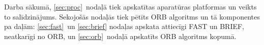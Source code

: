 Darba sākumā, \ref{sec:proc}~nodaļā tiek apskatītas aparatūras platformas
un veikts to salīdzinājums. Sekojošās nodaļās tiek pētīts ORB algoritms un
tā komponentes pa daļām: \ref{sec:fast}~un \ref{sec:brief} nodaļas apskata
attiecīgi FAST un BRIEF, neatkarīgi no ORB, un \ref{sec:orb}~nodaļā apskatīts
ORB algoritms kopumā.
